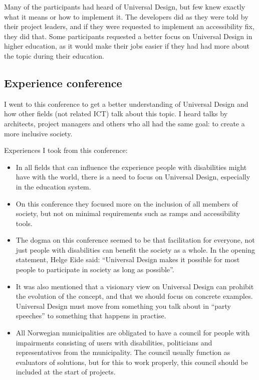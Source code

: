 Many of the participants had heard of Universal Design, but few knew exactly what it means or how to implement it. The developers did as they were told by their project leaders, and if they were requested to implement an accessibility fix, they did that. Some participants requested a better focus on Universal Design in higher education, as it would make their jobs easier if they had had more about the topic during their education.

\subsection{Experience conference}
I went to this conference to get a better understanding of Universal Design and how other fields (not related ICT) talk about this topic. I heard talks by architects, project managers and others who all had the same goal: to create a more inclusive society. 

Experiences I took from this conference:
\begin{itemize}
\item In all fields that can influence the experience people with disabilities might have with the world, there is a need to focus on Universal Design, especially in the education system.
\item On this conference they focused more on the inclusion of all members of society, but not on minimal requirements such as ramps and accessibility tools. 
\item The dogma on this conference seemed to be that facilitation for everyone, not just people with disabilities can benefit the society as a whole. In the opening statement, Helge Eide said: “Universal Design makes it possible for most people to participate in society as long as possible”. 
\item It was also mentioned that a visionary view on Universal Design can prohibit the evolution of the concept, and that we should focus on concrete examples. Universal Design must move from something you talk about in “party speeches” to something that happens in practise.
\item All Norwegian municipalities are obligated to have a council for people with impairments consisting of users with disabilities, politicians and representatives from the municipality. The council usually function as evaluators of solutions, but for this to work properly, this council should be included at the start of projects. 
\end{itemize}

